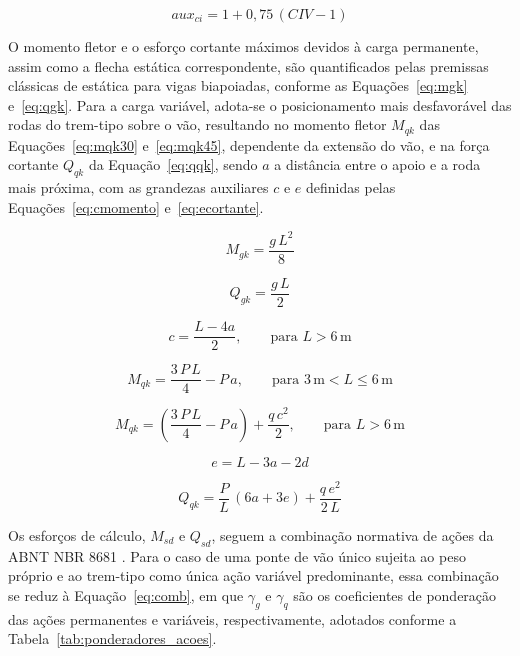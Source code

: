 \begin{equation}
aux_{ci} = 1 + 0{,}75\,(CIV - 1)
\label{eq:civaux}
\end{equation}

O momento fletor e o esforço cortante máximos devidos à carga permanente, assim como a flecha estática correspondente, são quantificados pelas premissas clássicas de estática para vigas biapoiadas, conforme as Equações~\eqref{eq:mgk} e~\eqref{eq:qgk}.
Para a carga variável, adota-se o posicionamento mais desfavorável das rodas do trem-tipo sobre o vão, resultando no momento fletor $M_{qk}$ das Equações~\eqref{eq:mqk30} e~\eqref{eq:mqk45}, dependente da extensão do vão, e na força cortante $Q_{qk}$ da Equação~\eqref{eq:qqk}, sendo $a$ a distância entre o apoio e a roda mais próxima, com as grandezas auxiliares $c$ e $e$ definidas pelas Equações~\eqref{eq:cmomento} e~\eqref{eq:ecortante}.

\begin{equation}
M_{gk} = \frac{g\,L^2}{8}
\label{eq:mgk}
\end{equation}

\begin{equation}
Q_{gk} = \frac{g\,L}{2}
\label{eq:qgk}
\end{equation}

\begin{equation}
c = \frac{L - 4a}{2}, \qquad \text{para } L > 6\,\text{m}
\label{eq:cmomento}
\end{equation}

\begin{equation}
M_{qk} = \frac{3\,P\,L}{4} - P\,a, \qquad \text{para } 3\,\text{m} < L \leq 6\,\text{m}
\label{eq:mqk30}
\end{equation}

\begin{equation}
M_{qk} = \left(\frac{3\,P\,L}{4} - P\,a\right) + \frac{q\,c^2}{2}, \qquad \text{para } L > 6\,\text{m}
\label{eq:mqk45}
\end{equation}

\begin{equation}
e = L - 3a - 2d
\label{eq:ecortante}
\end{equation}

\begin{equation}
Q_{qk} = \frac{P}{L}\,(6a + 3e) + \frac{q\,e^2}{2\,L}
\label{eq:qqk}
\end{equation}

Os esforços de cálculo, $M_{sd}$ e $Q_{sd}$, seguem a combinação normativa de ações da ABNT NBR 8681 \parencite{NBR8681:2025}.
Para o caso de uma ponte de vão único sujeita ao peso próprio e ao trem-tipo como única ação variável predominante, essa combinação se reduz à Equação~\eqref{eq:comb}, em que $\gamma_g$ e $\gamma_q$ são os coeficientes de ponderação das ações permanentes e variáveis, respectivamente, adotados conforme a Tabela~\ref{tab:ponderadores_acoes}.

